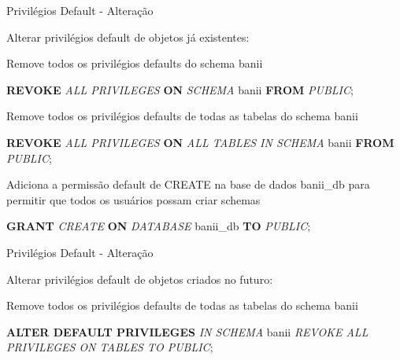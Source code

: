 \documentclass[xcolor=x11names,compress]{beamer}
\begin{document}
\begin{frame} {Privilégios Default - Alteração}

Alterar privilégios default de objetos já existentes:

\begin{alertblock}{Remove todos os privilégios defaults do schema banii}

\textbf{REVOKE} \textit{ALL PRIVILEGES} \textbf{ON} \textit{SCHEMA} banii \textbf{FROM} \textit{PUBLIC};

\end{alertblock}

\begin{alertblock}{Remove todos os privilégios defaults de todas as tabelas do schema banii}

\textbf{REVOKE} \textit{ALL PRIVILEGES} \textbf{ON} \textit{ALL TABLES IN SCHEMA} banii \textbf{FROM} \textit{PUBLIC};

\end{alertblock}

\begin{alertblock}{Adiciona a permissão default de CREATE na base de dados banii\_db para permitir que todos os usuários possam criar schemas}

\textbf{GRANT} \textit{CREATE} \textbf{ON} \textit{DATABASE} banii\_db \textbf{TO} \textit{PUBLIC};

\end{alertblock}

\end{frame}

\begin{frame} {Privilégios Default - Alteração}

Alterar privilégios default de objetos criados no futuro:

\begin{alertblock}{Remove todos os privilégios defaults de todas as tabelas do schema banii}

\textbf{ALTER DEFAULT PRIVILEGES} \textit{IN SCHEMA} banii \textit{REVOKE ALL PRIVILEGES ON TABLES TO PUBLIC};

\end{alertblock}

\end{frame}

\section{}
\end{document}
